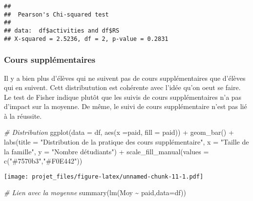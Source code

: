 \documentclass[
]{article}
\newenvironment{Shaded}{\begin{snugshade}}{\end{snugshade}}
\newcommand{\AttributeTok}[1]{\textcolor[rgb]{0.77,0.63,0.00}{#1}}
\newcommand{\CommentTok}[1]{\textcolor[rgb]{0.56,0.35,0.01}{\textit{#1}}}
\newcommand{\FunctionTok}[1]{\textcolor[rgb]{0.00,0.00,0.00}{#1}}
\newcommand{\NormalTok}[1]{#1}
\newcommand{\SpecialCharTok}[1]{\textcolor[rgb]{0.00,0.00,0.00}{#1}}
\newcommand{\StringTok}[1]{\textcolor[rgb]{0.31,0.60,0.02}{#1}}
\begin{document}
\begin{Shaded}
\end{Shaded}

\begin{verbatim}
## 
##  Pearson's Chi-squared test
## 
## data:  df$activities and df$RS
## X-squared = 2.5236, df = 2, p-value = 0.2831
\end{verbatim}

\hypertarget{cours-suppluxe9mentaires}{%
\subsubsection{Cours supplémentaires}\label{cours-suppluxe9mentaires}}

Il y a bien plus d'élèves qui ne suivent pas de cours supplémentaires
que d'élèves qui en suivent. Cett distributution est cohérente avec
l'idée qu'on oeut se faire. Le test de Fisher indique plutôt que les
suivis de cours supplémentaires n'a pas d'impact sur la moyenne. De
même, le suivi de cours supplémentaire n'est pas lié à la réussite.

\begin{Shaded}
\begin{Highlighting}[]
\CommentTok{\# Distribution}
\FunctionTok{ggplot}\NormalTok{(}\AttributeTok{data =}\NormalTok{ df, }\FunctionTok{aes}\NormalTok{(}\AttributeTok{x =}\NormalTok{paid, }\AttributeTok{fill =}\NormalTok{ paid)) }\SpecialCharTok{+}
  \FunctionTok{geom\_bar}\NormalTok{() }\SpecialCharTok{+}
  \FunctionTok{labs}\NormalTok{(}\AttributeTok{title =} \StringTok{"Distribution de la pratique des cours supplémentaire"}\NormalTok{,}
       \AttributeTok{x =} \StringTok{"Taille de la famille"}\NormalTok{, }\AttributeTok{y =} \StringTok{"Nombre d\textquotesingle{}étudiants"}\NormalTok{) }\SpecialCharTok{+}
  \FunctionTok{scale\_fill\_manual}\NormalTok{(}\AttributeTok{values =} \FunctionTok{c}\NormalTok{(}\StringTok{"\#7570b3"}\NormalTok{,}\StringTok{"\#F0E442"}\NormalTok{))}
\end{Highlighting}
\end{Shaded}

\texttt{[image: projet\_files/figure-latex/unnamed-chunk-11-1.pdf]}

\begin{Shaded}
\begin{Highlighting}[]
\CommentTok{\# Lien avec la moyenne}
\FunctionTok{summary}\NormalTok{(}\FunctionTok{lm}\NormalTok{(Moy }\SpecialCharTok{\textasciitilde{}}\NormalTok{ paid,}\AttributeTok{data=}\NormalTok{df))}
\end{Highlighting}
\end{Shaded}
\end{document}
